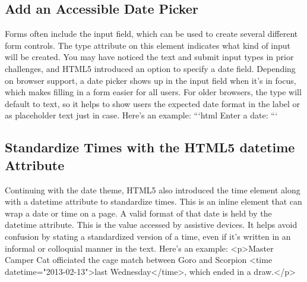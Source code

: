 \documentclass{article}%
\begin{document}
%
\subsection{Add an Accessible Date Picker}%
\label{subsec:AddanAccessibleDatePicker}%
Forms often include the input field, which can be used to create several different form controls. The type attribute on this element indicates what kind of input will be created.\newline%
You may have noticed the text and submit input types in prior challenges, and HTML5 introduced an option to specify a date field. Depending on browser support, a date picker shows up in the input field when it's in focus, which makes filling in a form easier for all users.\newline%
For older browsers, the type will default to text, so it helps to show users the expected date format in the label or as placeholder text just in case.\newline%
Here's an example:\newline%
```html\newline%
Enter a date:\newline%
```\newline%

%
\subsection{Standardize Times with the HTML5 datetime Attribute}%
\label{subsec:StandardizeTimeswiththeHTML5datetimeAttribute}%
Continuing with the date theme, HTML5 also introduced the time element along with a datetime attribute to standardize times. This is an inline element that can wrap a date or time on a page. A valid format of that date is held by the datetime attribute. This is the value accessed by assistive devices. It helps avoid confusion by stating a standardized version of a time, even if it's written in an informal or colloquial manner in the text.\newline%
Here's an example:\newline%
<p>Master Camper Cat officiated the cage match between Goro and Scorpion <time datetime="2013{-}02{-}13">last Wednesday</time>, which ended in a draw.</p>\newline%

%
\end{document}
